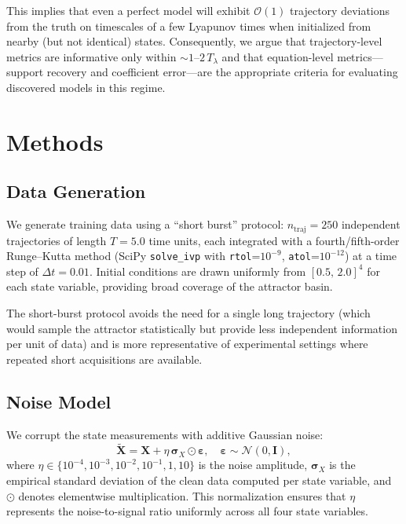 \documentclass[12pt]{article}
\newcommand{\bX}{\mathbf{X}}
\begin{document}
This implies that even a perfect model will exhibit $\mathcal{O}(1)$ trajectory deviations from the truth on timescales of a few Lyapunov times when initialized from nearby (but not identical) states.
Consequently, we argue that trajectory-level metrics are informative only within ${\sim}1$--$2\,T_\lambda$ and that equation-level metrics---support recovery and coefficient error---are the appropriate criteria for evaluating discovered models in this regime.


\section{Methods}
\label{sec:methods}

\subsection{Data Generation}
\label{sec:data}

We generate training data using a ``short burst'' protocol: $n_\text{traj} = 250$ independent trajectories of length $T = 5.0$ time units, each integrated with a fourth/fifth-order Runge--Kutta method (SciPy \texttt{solve\_ivp} with \texttt{rtol}=$10^{-9}$, \texttt{atol}=$10^{-12}$) at a time step of $\Delta t = 0.01$.
Initial conditions are drawn uniformly from $[0.5,\, 2.0]^4$ for each state variable, providing broad coverage of the attractor basin.

The short-burst protocol avoids the need for a single long trajectory (which would sample the attractor statistically but provide less independent information per unit of data) and is more representative of experimental settings where repeated short acquisitions are available.

\subsection{Noise Model}
\label{sec:noise}

We corrupt the state measurements with additive Gaussian noise:
\begin{equation}
\tilde{\bX} = \bX + \eta\,\boldsymbol{\sigma}_X \odot \boldsymbol{\varepsilon}, \quad \boldsymbol{\varepsilon} \sim \mathcal{N}(0, \mathbf{I}),
\label{eq:noise}
\end{equation}
where $\eta \in \{10^{-4}, 10^{-3}, 10^{-2}, 10^{-1}, 1, 10\}$ is the noise amplitude, $\boldsymbol{\sigma}_X$ is the empirical standard deviation of the clean data computed per state variable, and $\odot$ denotes elementwise multiplication.
This normalization ensures that $\eta$ represents the noise-to-signal ratio uniformly across all four state variables.
\end{document}
